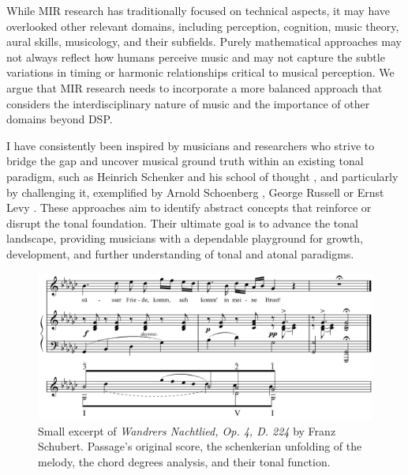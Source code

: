 While MIR research has traditionally focused on technical aspects, it may have overlooked other relevant domains, including perception, cognition, music theory, aural skills, musicology, and their subfields. Purely mathematical approaches may not always reflect how humans perceive music and may not capture the subtle variations in timing or harmonic relationships critical to musical perception. We argue that MIR research needs to incorporate a more balanced approach that considers the interdisciplinary nature of music and the importance of other domains beyond DSP.

I have consistently been inspired by musicians and researchers who strive to bridge the gap and uncover musical ground truth within an existing tonal paradigm, such as Heinrich Schenker and his school of thought \cite{Komar1959SchenkersStructure}, and particularly by challenging it, exemplified by Arnold Schoenberg \cite{Samson1974SchoenbergsMusic}, George Russell \cite{LydianRussell} or Ernst Levy \cite{LevyAHarmony}. These approaches aim to identify abstract concepts that reinforce or disrupt the tonal foundation. Their ultimate goal is to advance the tonal landscape, providing musicians with a dependable playground for growth, development, and further understanding of tonal and atonal paradigms.


\begin{figure}[ht]
\includegraphics[clip,width=\columnwidth]{figures/schenkerian analysis/SchubertOp4no3.png}%
\caption[Excerpt of \textit{Wandrers Nachtlied, Op. 4, D. 224} by Franz Schubert.]{\small{Small excerpt of \textit{Wandrers Nachtlied, Op. 4, D. 224} by Franz Schubert. Passage's original score, the schenkerian unfolding of the melody, the chord degrees analysis, and their tonal function.}}
\label{fig:Wandrers Nachtlied, Op. 4, D. 224}
\end{figure}